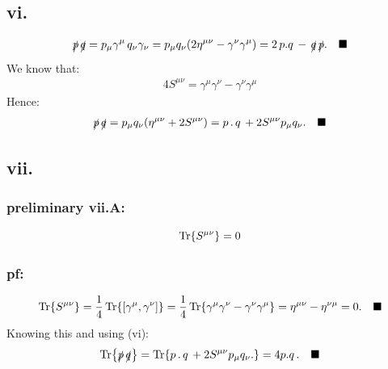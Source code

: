\documentclass{article}
\newcommand{\slashp}{\slashed{p}}
\newcommand{\slashq}{\slashed{q}}
\begin{document}
\subsection*{vi.}
\begin{equation}
    \begin{split}
        \slashp \, \slashq = p_\mu\gamma^\mu \, q_\nu\gamma_\nu = p_\mu q_\nu(2\eta^{\mu\nu}-\gamma^\nu\gamma^\mu) = 2\, p.q \, - \, \slashq\,\slashp. \quad \blacksquare
    \end{split}
\end{equation}
We know that:
\begin{equation}
    \begin{split}
        4S^{\mu\nu} = \gamma^\mu\gamma^\nu - \gamma^\nu\gamma^\mu
    \end{split}
\end{equation}
Hence:
\begin{equation}
    \begin{split}
        \slashp \, \slashq = p_\mu q_\nu(\eta^{\mu\nu} + 2S^{\mu\nu})=p\, .\, q \, + 2S^{\mu\nu}p_\mu q_\nu. \quad \blacksquare
    \end{split}
\end{equation}

\subsection*{vii.}
\subsubsection*{preliminary vii.A:}$$\Tr{S^{\mu\nu}}=0$$
\subsubsection*{pf:}
\begin{equation}
    \Tr{S^{\mu\nu}} = \frac14 \Tr{[\gamma^\mu, \gamma^\nu]} = \frac14\Tr{\gamma^\mu\gamma^\nu - \gamma^\nu\gamma^\mu} = \eta^{\mu\nu}-\eta^{\nu\mu} = 0. \quad \blacksquare
\end{equation}
Knowing this and using (vi):
\begin{equation}
    \begin{split}
        \Tr{\slashp \, \slashq}=\Tr{p\, .\, q \, + 2S^{\mu\nu}p_\mu q_\nu.} = 4p . q\, . \quad \blacksquare
    \end{split}
\end{equation}
\end{document}
